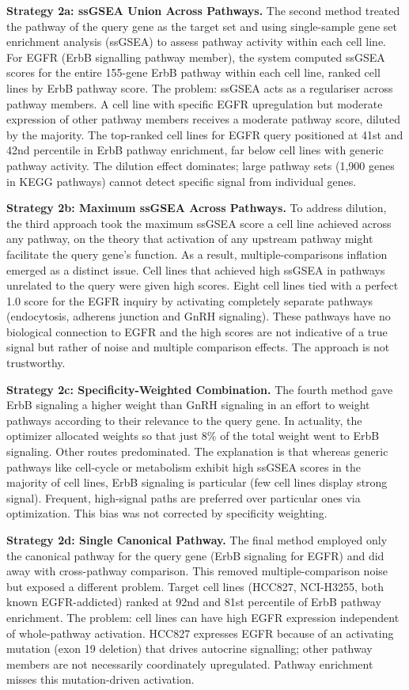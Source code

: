 \documentclass[author={Karen Coutinho, Ishaan Bhalla, Aman Raj, Dixit Kaloorani Malarmannan},
                supervisor={Dr. Daniel D'Andrea},
                degree={MSc},
                title={CellSelector Omics: A Multi-Omics Recommendation System for Cell Line Selection},
                subtitle={},
                type={},
                year={2026}]{dissertation}
\begin{document}
{\bf Strategy 2a: ssGSEA Union Across Pathways.} The second method treated the pathway of the query gene as the target set and using single-sample gene set enrichment analysis (ssGSEA) to assess pathway activity within each cell line. For EGFR (ErbB signalling pathway member), the system computed ssGSEA scores for the entire 155-gene ErbB pathway within each cell line, ranked cell lines by ErbB pathway score. The problem: ssGSEA acts as a regulariser across pathway members. A cell line with specific EGFR upregulation but moderate expression of other pathway members receives a moderate pathway score, diluted by the majority. The top-ranked cell lines for EGFR query positioned at 41st and 42nd percentile in ErbB pathway enrichment, far below cell lines with generic pathway activity. The dilution effect dominates; large pathway sets (1,900 genes in KEGG pathways) cannot detect specific signal from individual genes.

{\bf Strategy 2b: Maximum ssGSEA Across Pathways.} To address dilution, the third approach took the maximum ssGSEA score a cell line achieved across any pathway, on the theory that activation of any upstream pathway might facilitate the query gene's function. As a result, multiple-comparisons inflation emerged as a distinct issue. Cell lines that achieved high ssGSEA in pathways unrelated to the query were given high scores. Eight cell lines tied with a perfect 1.0 score for the EGFR inquiry by activating completely separate pathways (endocytosis, adherens junction and GnRH signaling). These pathways have no biological connection to EGFR and the high scores are not indicative of a true signal but rather of noise and multiple comparison effects. The approach is not trustworthy.

{\bf Strategy 2c: Specificity-Weighted Combination.} The fourth method gave ErbB signaling a higher weight than GnRH signaling in an effort to weight pathways according to their relevance to the query gene. In actuality, the optimizer allocated weights so that just 8\% of the total weight went to ErbB signaling. Other routes predominated. The explanation is that whereas generic pathways like cell-cycle or metabolism exhibit high ssGSEA scores in the majority of cell lines, ErbB signaling is particular (few cell lines display strong signal). Frequent, high-signal paths are preferred over particular ones via optimization. This bias was not corrected by specificity weighting.

{\bf Strategy 2d: Single Canonical Pathway.} The final method employed only the canonical pathway for the query gene (ErbB signaling for EGFR) and did away with cross-pathway comparison. This removed multiple-comparison noise but exposed a different problem. Target cell lines (HCC827, NCI-H3255, both known EGFR-addicted) ranked at 92nd and 81st percentile of ErbB pathway enrichment. The problem: cell lines can have high EGFR expression independent of whole-pathway activation. HCC827 expresses EGFR because of an activating mutation (exon 19 deletion) that drives autocrine signalling; other pathway members are not necessarily coordinately upregulated. Pathway enrichment misses this mutation-driven activation.
\end{document}
